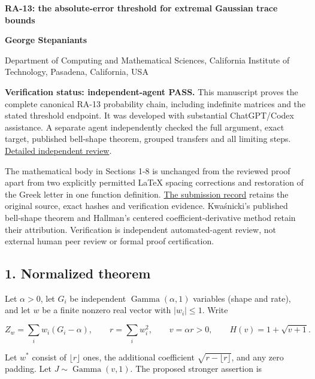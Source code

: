 \documentclass[10pt,a4paper]{article}
\begin{document}
{\raggedright\Large\bfseries RA-13: the absolute-error threshold for
extremal Gaussian trace bounds\par}
\vspace{0.4em}
{\normalsize\bfseries George Stepaniants\par}
{\small Department of Computing and Mathematical Sciences, California
Institute of Technology, Pasadena, California, USA\par}
\vspace{0.6em}
\textbf{Verification status: independent-agent PASS.} This manuscript
proves the complete canonical RA-13 probability chain, including
indefinite matrices and the stated threshold endpoint. It was developed
with substantial ChatGPT/Codex assistance. A separate agent
independently checked the full argument, exact target, published
bell-shape theorem, grouped transfers and all limiting steps.
\href{https://github.com/ajt60gaibb/OpenProblemsInNLA/blob/main/references/stepaniants-ra13-2026-09-11/verification/RA-13-independent-review.md}{Detailed
independent review}.

The mathematical body in Sections 1-8 is unchanged from the reviewed
proof apart from two explicitly permitted LaTeX spacing corrections and
restoration of the Greek letter in one function definition.
\href{https://github.com/ajt60gaibb/OpenProblemsInNLA/blob/main/references/stepaniants-ra13-2026-09-11/README.md}{The
submission record} retains the original source, exact hashes and
verification evidence. Kwaśnicki's published bell-shape theorem and
Hallman's centered coefficient-derivative method retain their
attribution. Verification is independent automated-agent review, not
external human peer review or formal proof certification.

\subsection{1. Normalized theorem}\label{normalized-theorem}

Let \(\alpha>0\), let \(G_i\) be independent
\(\operatorname{Gamma}(\alpha,1)\) variables (shape and rate), and let
\(w\) be a finite nonzero real vector with \(|w_i|\le1\). Write

\[
Z_w=\sum_iw_i(G_i-\alpha),\qquad
r=\sum_iw_i^2,\qquad v=\alpha r>0,
\qquad H(v)=1+\sqrt{v+1}.
\]

Let \(w^*\) consist of \(\lfloor r\rfloor\) ones, the additional
coefficient \(\sqrt{r-\lfloor r\rfloor}\), and any zero padding. Let
\(J\sim\operatorname{Gamma}(v,1)\). The proposed stronger assertion is
\end{document}
